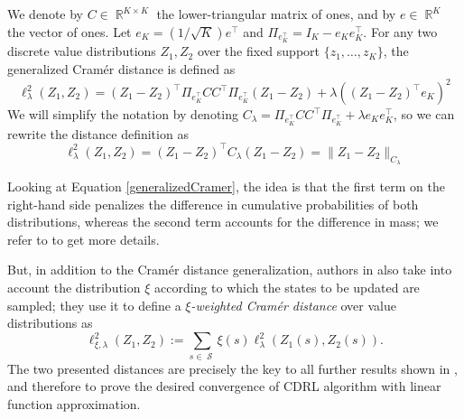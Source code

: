 \documentclass[12pt,a4paper,openright,twoside]{article}
\DeclareMathOperator*{\R}{\mathbb{R}}
\DeclareMathOperator*{\Sspace}{\mathcal{S}}
\numberwithin{equation}{section}
\theoremstyle{definition}
\theoremstyle{remark}
\theoremstyle{plain}
\begin{document}
We denote by $C\in \R^{K\times K}$ the lower-triangular matrix of ones, and by $e\in\R^K$ the vector of ones. Let $e_K= (1/\sqrt{K}) e^\top$ and $\Pi_{e_K^\top} = I_K - e_K e_K^\top$. For any two discrete value distributions $Z_1, Z_2$ over the fixed support $\{z_1,\dots,z_K\}$, the generalized Cramér distance is defined as
\begin{equation} \label{generalizedCramer}
	\ell_{\lambda}^2(Z_1,Z_2) = (Z_1 - Z_2)^\top \Pi_{e_K^\top} C C^\top \Pi_{e_K^\top} (Z_1 - Z_2) + \lambda ((Z_1 - Z_2)^\top e_K)^2 
\end{equation}
We will simplify the notation by denoting $C_\lambda = \Pi_{e_K^\top} C C^\top \Pi_{e_K^\top} + \lambda e_K e_K^\top $, so we can rewrite the distance definition as 
\begin{equation*}
	\ell_{\lambda}^2(Z_1,Z_2) = (Z_1 - Z_2)^\top C_\lambda (Z_1 - Z_2) = \| Z_1 - Z_2 \|_{C_\lambda}
\end{equation*}

Looking at Equation \ref{generalizedCramer}, the idea is that the first term on the right-hand side penalizes the difference in cumulative probabilities of both distributions, whereas the second term accounts for the difference in mass; we refer to \cite{DRLlinear} to get more details.

But, in addition to the Cramér distance generalization, authors in \cite{DRLlinear} also take into account the distribution $\xi$ according to which the states to be updated are sampled; %
they use it to define a \textit{$\xi$-weighted Cramér distance} over value distributions as
\begin{equation} \label{weightedCramer} 
	\ell_{\xi,\lambda}^2 (Z_1,Z_2) := \sum_{s \in \Sspace} \xi(s) \ell_{\lambda}^{2}  (Z_1(s),Z_2(s)).
\end{equation}
The two presented distances are precisely the key to all further results shown in \cite{DRLlinear}, and therefore to prove the desired convergence of CDRL algorithm with linear function approximation.
\end{document}
